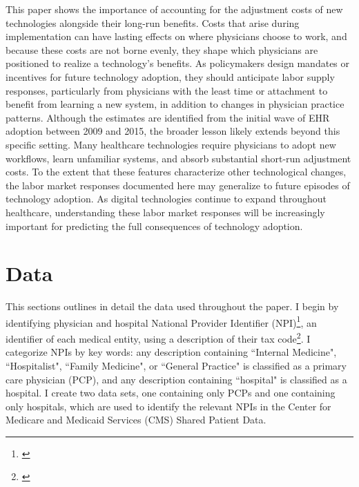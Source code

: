 \documentclass[12pt]{article}
\begin{document}
This paper shows the importance of accounting for the adjustment costs of new technologies alongside their long-run benefits. Costs that arise during implementation can have lasting effects on where physicians choose to work, and because these costs are not borne evenly, they shape which physicians are positioned to realize a technology's benefits. As policymakers design mandates or incentives for future technology adoption, they should anticipate labor supply responses, particularly from physicians with the least time or attachment to benefit from learning a new system, in addition to changes in physician practice patterns. Although the estimates are identified from the initial wave of EHR adoption between 2009 and 2015, the broader lesson likely extends beyond this specific setting. Many healthcare technologies require physicians to adopt new workflows, learn unfamiliar systems, and absorb substantial short-run adjustment costs. To the extent that these features characterize other technological changes, the labor market responses documented here may generalize to future episodes of technology adoption. As digital technologies continue to expand throughout healthcare, understanding these labor market responses will be increasingly important for predicting the full consequences of technology adoption.




\clearpage
\onehalfspacing

\printbibliography

\clearpage

\normalsize
\appendix

\renewcommand{\thetable}{A\arabic{table}}
\renewcommand{\thefigure}{A\arabic{figure}}

\section{Data}\label{app:data}

This sections outlines in detail the data used throughout the paper. I begin by identifying physician and hospital National Provider Identifier (NPI)\footnote{\hyperlink{https://download.cms.gov/nppes/NPI/Files.html}{}}, an identifier of each medical entity, using a description of their tax code\footnote{\hyperlink{https://nucc.org/index.php/code-sets-mainmenu-41/provider-taxonomy-mainmenu-40/pdf-mainmenu-53}{}}. I categorize NPIs by key words: any description containing ``Internal Medicine", ``Hospitalist", ``Family Medicine", or ``General Practice" is classified as a primary care physician (PCP), and any description containing ``hospital" is classified as a hospital. I create two data sets, one containing only PCPs and one containing only hospitals, which are used to identify the relevant NPIs in the Center for Medicare and Medicaid Services (CMS) Shared Patient Data. 
\end{document}
